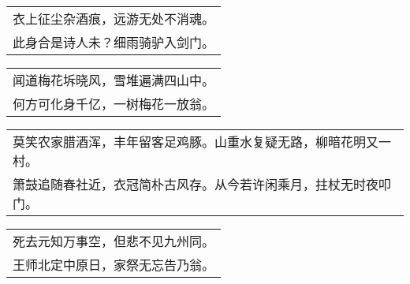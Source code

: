 \nopagebreak%
\nopagebreak%
\noindent\begin{minipage}{\linewidth}
  \vskip-3pt\begin{table}[H]
    \centering
    \begin{tabular}{@{}l@{}}
衣上征尘杂酒痕，远游无处不消魂。\\
此身合是诗人未？细雨骑驴入剑门。
    \end{tabular}
  \end{table}
\end{minipage}
\vspace{1cm}


\nopagebreak%
\nopagebreak%
\noindent\begin{minipage}{\linewidth}
  \vskip-3pt\begin{table}[H]
    \centering
    \begin{tabular}{@{}l@{}}
闻道梅花坼晓风，雪堆遍满四山中。\\
何方可化身千亿，一树梅花一放翁。
    \end{tabular}
  \end{table}
\end{minipage}
\vspace{1cm}


\nopagebreak%
\nopagebreak%
\noindent\begin{minipage}{\linewidth}
  \vskip-3pt\begin{table}[H]
    \centering
    \begin{tabular}{@{}l@{}}
莫笑农家腊酒浑，丰年留客足鸡豚。山重水复疑无路，柳暗花明又一村。\\
箫鼓追随春社近，衣冠简朴古风存。从今若许闲乘月，拄杖无时夜叩门。
    \end{tabular}
  \end{table}
\end{minipage}
\vspace{1cm}


\nopagebreak%
\nopagebreak%
\noindent\begin{minipage}{\linewidth}
  \vskip-3pt\begin{table}[H]
    \centering
    \begin{tabular}{@{}l@{}}
死去元知万事空，但悲不见九州同。\\
王师北定中原日，家祭无忘告乃翁。
    \end{tabular}
  \end{table}
\end{minipage}
\vspace{1cm}


